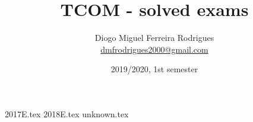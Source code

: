 \documentclass[a4paper]{article}
\title{TCOM - solved exams}
\author{Diogo Miguel Ferreira Rodrigues \\ \href{mailto:dmfrodrigues2000@gmail.com}{dmfrodrigues2000@gmail.com}}
\date{2019/2020, 1st semester}
\begin{document}
\begingroup
	\maketitle
	\let\clearpage\relax
	\setcounter{tocdepth}{2}
	\tableofcontents
\endgroup
{2017E.tex}
{2018E.tex}
{unknown.tex}
\end{document}

